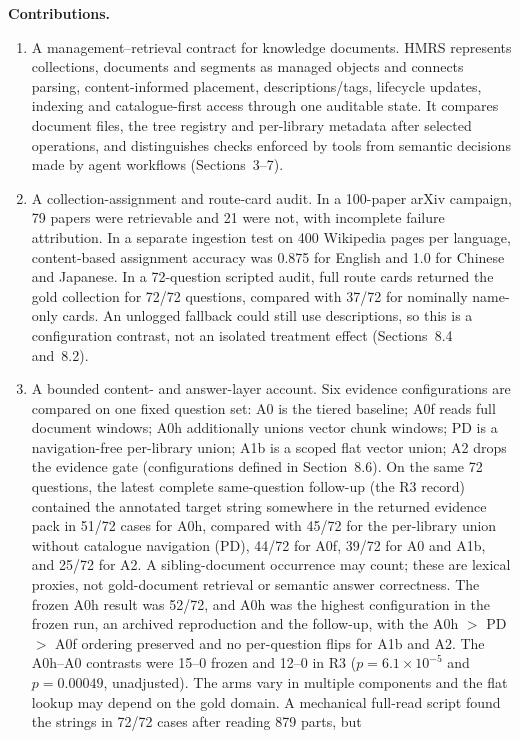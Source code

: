 \documentclass[11pt]{article}
\begin{document}
\noindent\textbf{Contributions.}
\begin{enumerate}
\item A management--retrieval contract for knowledge documents. HMRS represents
collections, documents and segments as managed objects and connects parsing,
content-informed placement, descriptions/tags, lifecycle updates, indexing and
catalogue-first access through one auditable state. It compares document files,
the tree registry and per-library metadata after selected operations, and
distinguishes checks enforced by tools from semantic decisions made by agent
workflows (Sections~3--7).
\item A collection-assignment and route-card audit. In a 100-paper arXiv
campaign, 79 papers were retrievable and 21 were not, with incomplete failure
attribution. In a separate ingestion test on 400 Wikipedia pages per language,
content-based assignment accuracy was 0.875 for English and 1.0 for Chinese and
Japanese. In a 72-question scripted audit, full route cards returned the gold
collection for 72/72 questions, compared with 37/72 for nominally name-only
cards. An unlogged fallback could still use descriptions, so this is a
configuration contrast, not an isolated treatment effect
(Sections~8.4 and~8.2).
\item A bounded content- and answer-layer account. Six evidence
configurations are compared on one fixed question set: A0 is the tiered
baseline; A0f reads full document windows; A0h additionally unions vector
chunk windows; PD is a navigation-free per-library union; A1b is a scoped
flat vector union; A2 drops the evidence gate (configurations defined in
Section~8.6). On the same 72 questions,
the latest complete same-question follow-up (the R3 record) contained the
annotated target string somewhere in the returned evidence pack in 51/72 cases
for A0h, compared with 45/72 for the per-library union without catalogue
navigation (PD), 44/72 for A0f, 39/72 for A0 and A1b, and 25/72 for A2. A
sibling-document occurrence may count; these are lexical proxies, not
gold-document retrieval or semantic answer correctness. The frozen A0h result
was 52/72, and A0h
was the highest configuration in the frozen run, an archived reproduction
and the follow-up, with the A0h $>$ PD $>$ A0f ordering preserved and no
per-question flips for A1b and A2. The A0h--A0 contrasts were 15--0 frozen
and 12--0 in R3 ($p=6.1\times10^{-5}$ and $p=0.00049$, unadjusted). The arms
vary in multiple components and the flat lookup may depend on the gold
domain. A mechanical
full-read script found the strings in 72/72 cases after reading 879 parts, but

\end{enumerate}
\end{document}
